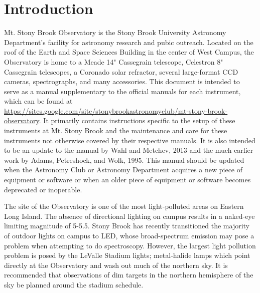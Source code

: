 \documentclass[12pt,titlepage]{article}
\begin{document}

\tableofcontents
\setcounter{tocdepth}{2}
\thispagestyle{empty}
\clearpage


\setcounter{page}{1}
\section{Introduction}
Mt. Stony Brook Observatory is the Stony Brook University Astronomy Department's facility for astronomy research and pubic outreach.
Located on the roof of the Earth and Space Sciences Building in the center of West Campus, the Observatory is home to a Meade 14" Cassegrain telescope, Celestron 8" Cassegrain telescopes, a Coronado solar refractor, several large-format CCD cameras, spectrographs, and many accessories.
This document is intended to serve as a manual supplementary to the official manuals for each instrument, which can be found at \url{https://sites.google.com/site/stonybrookastronomyclub/mt-stony-brook-observatory}.
It primarily contains instructions specific to the setup of these instruments at Mt. Stony Brook and the maintenance and care for these instruments not otherwise covered by their respective manuals.
It is also intended to be an update to the manual by Wahl and Metchev, 2013 \cite{wahl13} and the much earlier work by Adams, Petreshock, and Wolk, 1995\cite{adams95}.
This manual should be updated when the Astronomy Club or Astronomy Department acquires a new piece of equipment or software or when an older piece of equipment or software becomes deprecated or inoperable.

The site of the Observatory is one of the most light-polluted areas on Eastern Long Island. The absence of directional lighting on campus results in a naked-eye limiting magnitude of 5-5.5. Stony Brook has recently transitioned the majority of outdoor lights on campus to LED, whose broad-spectrum emission may pose a problem when attempting to do spectroscopy. However, the largest light pollution problem is posed by the LeValle Stadium lights; metal-halide lamps which point directly at the Observatory and wash out much of the northern sky. It is recommended that observations of dim targets in the northern hemisphere of the sky be planned around the stadium schedule.
\end{document}
